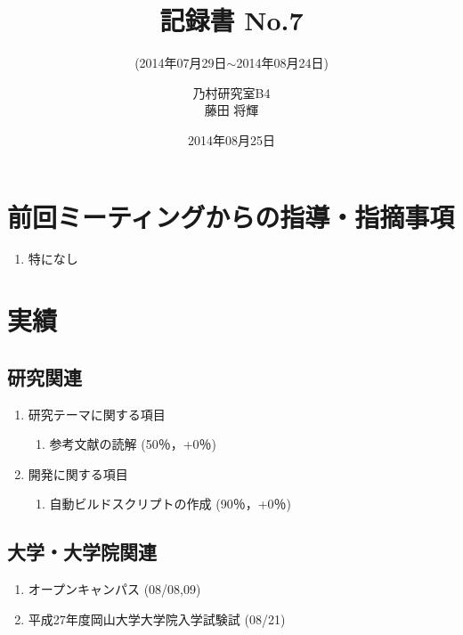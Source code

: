 \documentclass[fleqn, 14pt]{extarticle}
\subtitle{(2014年07月29日$\sim$2014年08月24日)}
\author{乃村研究室B4\\藤田 将輝}
\date{2014年08月25日}
\title{記録書 No.7}
\begin{document}
\maketitle




\section{前回ミーティングからの指導・指摘事項}
\label{sec-1}
\begin{enumerate}
\item 特になし
\newline
\hfill

\end{enumerate}




\section{実績}
\label{sec-2}

\subsection{研究関連}
\label{sec-2-1}
\begin{enumerate}
\item 研究テーマに関する項目
\hfill
\label{enum-research1}
\begin{enumerate}

\item 参考文献の読解
\hfill
\label{enum-1-A}
(50％，+0％)
\end{enumerate}
\item 開発に関する項目
\hfill
\label{enum-research2}
\begin{enumerate}

\item 自動ビルドスクリプトの作成
\hfill
\label{enum-2-A}
(90％，+0％)
\end{enumerate}


\end{enumerate}




\subsection{大学・大学院関連}
\label{sec-2-3}

\begin{enumerate}
\item オープンキャンパス
\hfill
\label{enum-univ2}
(08/08,09)
\item 平成27年度岡山大学大学院入学試験試
\hfill
\label{enum-univ3}
(08/21)
\end{enumerate}
\end{document}
